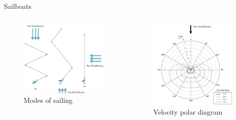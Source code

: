 \documentclass[10pt,xcolor={table,dvipsnames},t]{beamer}
\begin{document}
\begin{frame}{Sailboats}
\begin{columns}
\begin{figure}
    \centering
    \includegraphics[width=0.75\linewidth]{documents/figures/alves_modes.png}
    \caption{Modes of sailing \cite{Alves2010}}
    \label{fig:alves_modes}
\end{figure}
\begin{figure}
    \centering
    \includegraphics[width=0.7\linewidth]{documents/figures/alves_vpp.png}
    \caption{Velocity polar diagram \cite{Alves2010}}
    \label{fig:alves_velocity}
\end{figure}
\end{columns}
\end{frame}
\end{document}

